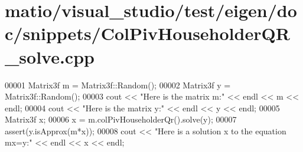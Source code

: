 \hypertarget{matio_2visual__studio_2test_2eigen_2doc_2snippets_2_col_piv_householder_q_r__solve_8cpp_source}{}\section{matio/visual\+\_\+studio/test/eigen/doc/snippets/\+Col\+Piv\+Householder\+Q\+R\+\_\+solve.cpp}
\label{matio_2visual__studio_2test_2eigen_2doc_2snippets_2_col_piv_householder_q_r__solve_8cpp_source}

\begin{DoxyCode}
00001 Matrix3f m = Matrix3f::Random();
00002 Matrix3f y = Matrix3f::Random();
00003 cout << \textcolor{stringliteral}{"Here is the matrix m:"} << endl << m << endl;
00004 cout << \textcolor{stringliteral}{"Here is the matrix y:"} << endl << y << endl;
00005 Matrix3f x;
00006 x = m.colPivHouseholderQr().solve(y);
00007 assert(y.isApprox(m*x));
00008 cout << \textcolor{stringliteral}{"Here is a solution x to the equation mx=y:"} << endl << x << endl;
\end{DoxyCode}
